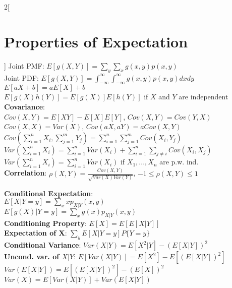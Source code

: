\documentclass{article}
\begin{document}
	\begin{multicols}{2}[\section*{Properties of Expectation}]
    Joint PMF: $E[g(X, Y)] = \sum_{y}\sum_{x}g(x, y)p(x, y)$\\
	Joint PDF: $E[g(X, Y)] = \int_{-\infty}^{\infty}\int_{-\infty}^{\infty}g(x, y)p(x, y)dxdy$\\
    $E[aX+ b] = aE[X] + b$\\
    $E[g(X)h(Y)] = E[g(X)]E[h(Y)]$ if $X$ and $Y$ are independent\\
    
    \textbf{Covariance}:\\
	$Cov(X, Y) = E[XY] - E[X]E[Y]$,  $Cov(X, Y)  = Cov(Y, X)$\\
    $Cov(X, X) = Var(X)$,  $Cov(aX,aY) = aCov(X, Y)$\\ 	
	$Cov(\sum_{i=1}^nX_i, \sum_{j=1}^mY_j) = \sum_{i=1}^n\sum_{j=1}^mCov(X_i,Y_j)$ \\
	$Var(\sum_{i = 1}^nX_i) = \sum_{i = 1}^nVar(X_i) + \sum_{i = 1}^n\sum_{j \neq i}Cov(X_i, X_j)$\\
	$Var(\sum_{i = 1}^nX_i) = \sum_{i = 1}^nVar(X_i)$ if $X_1,... , X_n$ are p.w. ind.\\
    
	\textbf{Correlation}: $\rho(X, Y) = \frac{Cov(X, Y)}{\sqrt{Var(X)Var(Y)}} $,  $-1 \leq \rho(X,Y) \leq 1$

	\textbf{Conditional Expectation}:\\$E[X \vert Y = y] = \sum_{x}xp_{X \vert Y}(x, y)$\\$E[g(X) \vert Y = y] = \sum_{x}g(x)p_{X \vert Y}(x, y)$\\
    
    \textbf{Conditioning Property}: $E[X] = E[E[X \vert Y]]$\\
    \textbf{Expectation of X}: $\sum_{y}E[X \vert Y = y]P\{Y = y\}$\\
	
    \textbf{Conditional Variance}: $Var(X \vert Y) = E[X^2 \vert Y] - (E[X \vert Y])^2$\\
    \textbf{Uncond. var. of $X \vert Y$}: $E[Var(X \vert Y)] = E[X^2] - E[(E[X \vert Y])^2]$\\
    $Var(E[X \vert Y]) = E[(E[X \vert Y])^2] - (E[X])^2$\\
    $Var(X) = E[Var(X \vert Y)] + Var(E[X \vert Y])$\\
    

\end{multicols}
\end{document}
